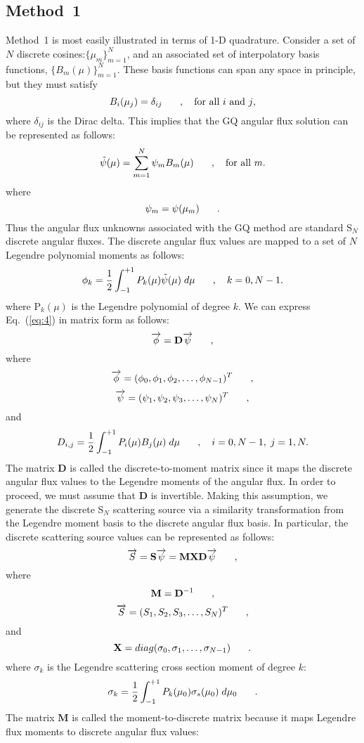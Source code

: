 \documentclass[12pt]{article}
\renewcommand{\vec}[1]{\overrightarrow{#1}}
\newcommand{\be}{\begin{equation}}
\newcommand{\ee}{\end{equation}}
\newcommand{\pec}{\hspace{0.25in},}
\newcommand{\pep}{\hspace{0.25in}.}
\newcommand{\LEQ}[1]{\label{eq:#1}}
\newcommand{\EQ}[1]{Eq.~(\ref{eq:#1})}
\newcommand{\mS}{\mathbf{S}}
\newcommand{\mD}{\mathbf{D}}
\newcommand{\mM}{\mathbf{M}}
\newcommand{\mX}{\mathbf{X}}
\begin{document}
\begin{center}
\section{Method~1}
Method~1 is most easily illustrated in terms of 1-D quadrature.  Consider a set of $N$ discrete cosines:$\{\mu_m\}_{m=1}^{N}$, and an associated set 
of interpolatory basis functions, $\{B_m(\mu)\}^{N}_{m=1}$.  These basis functions can span any space in principle, but they must satisfy 
\be
B_i(\mu_j) = \delta_{ij} \pec \quad \mbox{for all $i$ and $j$},
\LEQ{1}
\ee
where $\delta_{ij}$ is the Dirac delta.  This implies that the GQ angular flux solution can be represented as follows:
\be
\tilde{\psi}(\mu) = \sum_{m=1}^{N} \psi_m B_m(\mu) \pec \quad \mbox{for all $m$}.
\LEQ{2}
\ee
where 
\be
\psi_m = \psi(\mu_m) \pep
\LEQ{3}
\ee
Thus the angular flux unknowns associated with the GQ method are standard S$_N$ discrete angular fluxes.  The discrete angular 
flux values are mapped to a set of $N$ Legendre polynomial moments as follows:
\be
\phi_{k} = \frac{1}{2} \int_{-1}^{+1} P_k(\mu) \tilde{\psi}(\mu)  \; d\mu \pec \quad k=0,N-1.
\LEQ{4}
\ee
where P$_k(\mu)$ is the Legendre polynomial of degree $k$.
We can express \EQ{4} in matrix form as follows:
\be
\vec{\phi} = \mD \vec{\psi} \pec
\LEQ{5}
\ee
where 
\be
\vec{\phi} = (\phi_0, \phi_1, \phi_2 , \ldots, \phi_{N-1})^T \pec
\LEQ{6}
\ee 
\be
\vec{\psi} = (\psi_1, \psi_2, \psi_3, \ldots , \psi_N)^T \pec
\LEQ{7}
\ee
and 
\be
D_{i,j} = \frac{1}{2} \int_{-1}^{+1} P_i(\mu) B_{j}(\mu) \; d\mu \pec \quad i=0,N-1, \; j=1,N.
\LEQ{8}
\ee
The matrix $\mD$ is called the discrete-to-moment matrix since it maps the discrete angular flux 
values to the Legendre moments of the angular flux.  In order to proceed, we must assume that $\mD$ 
is invertible.  Making this assumption, we generate the discrete S$_N$ scattering source via a similarity 
transformation from the Legendre moment basis to the discrete angular flux basis. In particular, the 
discrete scattering source values can be represented as follows:
\be
\vec{S} = \mS \vec{\psi}  = \mM \mX \mD \vec{\psi} \pec
\LEQ{9} 
\ee
where 
\be
\mM = \mD^{-1} \pec
\LEQ{10}
\ee
\be
\vec{S} = (S_1, S_2, S_3, \ldots, S_N)^T \pec
\LEQ{11}
\ee
and
\be
\mX = diag(\sigma_0, \sigma_1, \ldots , \sigma_{N-1}) \pep
\LEQ{12}
\ee
where $\sigma_k$ is the Legendre scattering cross section moment of degree $k$:
\be
\sigma_k = \frac{1}{2} \int_{-1}^{+1} P_k(\mu_0) \sigma_s(\mu_0) \; d\mu_0 \pep
\LEQ{13}
\ee
The matrix $\mM$ is called the moment-to-discrete matrix because it maps Legendre flux moments 
to discrete angular flux values:

\end{center}
\end{document}
